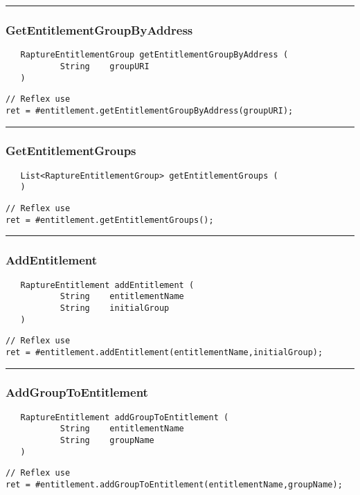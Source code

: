 \rule{15cm}{2pt}
\subsubsection{GetEntitlementGroupByAddress}
\label{Api:GetEntitlementGroupByAddress}
\begin{verbatim}
   RaptureEntitlementGroup getEntitlementGroupByAddress (
           String    groupURI
   )
\end{verbatim}
\begin{lstlisting}[language=reflex]
// Reflex use
ret = #entitlement.getEntitlementGroupByAddress(groupURI);
\end{lstlisting}



\rule{15cm}{2pt}
\subsubsection{GetEntitlementGroups}
\label{Api:GetEntitlementGroups}
\begin{verbatim}
   List<RaptureEntitlementGroup> getEntitlementGroups (
   )
\end{verbatim}
\begin{lstlisting}[language=reflex]
// Reflex use
ret = #entitlement.getEntitlementGroups();
\end{lstlisting}



\rule{15cm}{2pt}
\subsubsection{AddEntitlement}
\label{Api:AddEntitlement}
\begin{verbatim}
   RaptureEntitlement addEntitlement (
           String    entitlementName
           String    initialGroup
   )
\end{verbatim}
\begin{lstlisting}[language=reflex]
// Reflex use
ret = #entitlement.addEntitlement(entitlementName,initialGroup);
\end{lstlisting}



\rule{15cm}{2pt}
\subsubsection{AddGroupToEntitlement}
\label{Api:AddGroupToEntitlement}
\begin{verbatim}
   RaptureEntitlement addGroupToEntitlement (
           String    entitlementName
           String    groupName
   )
\end{verbatim}
\begin{lstlisting}[language=reflex]
// Reflex use
ret = #entitlement.addGroupToEntitlement(entitlementName,groupName);
\end{lstlisting}



